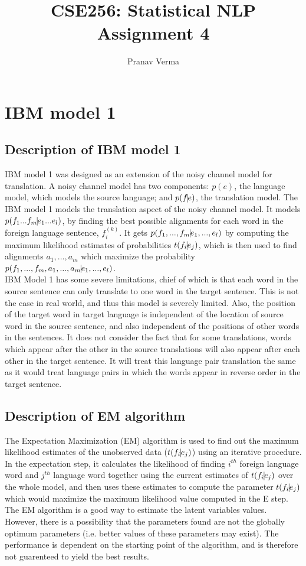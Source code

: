 \documentclass{article}
\title{CSE256: Statistical NLP Assignment 4}
\author{Pranav Verma}
\begin{document}
\maketitle
\section{IBM model 1}
	\subsection{Description of IBM model 1}
		IBM model 1 was designed as an extension of the noisy channel model for translation. A noisy channel model has two components: $p(e)$, the language model, which models the source language; and $p(f \vline e)$, the translation model. The IBM model 1 models the translation aspect of the noisy channel model. It models $p(f_{1}... f_{m} \vline e_{1}...e_{l})$, by finding the best possible alignments for each word in the foreign language sentence, $f_{i}^{(k)}$. It gets $p(f_{1},..., f_{m} \vline e_{1}, ..., e_{l})$ by computing the maximum likelihood estimates of probabilities $t(f_{i}\vline e_{j})$, which is then used to find alignments $a_{1},...,a_{m}$ which maximize the probability $p(f_{1},..., f_{m}, a_1,..., a_m \vline e_{1}, ..., e_{l})$.
		\\IBM Model 1 has some severe limitations, chief of which is that each word in the source sentence can only translate to one word in the target sentence. This is not the case in real world, and thus this model is severely limited. Also, the position of the target word in target language is independent of the location of source word in the source sentence, and also independent of the positions of other words in the sentences. It does not consider the fact that for some translations, words which appear after the other in the source translations will also appear after each other in the target sentence. It will treat this language pair translation the same as it would treat language pairs in which the words appear in reverse order in the target sentence.
	\subsection{Description of EM algorithm}
		The Expectation Maximization (EM) algorithm is used to find out the maximum likelihood estimates of the unobserved data ($t(f_{i}\vline e_{j})$) using an iterative procedure. In the expectation step, it calculates the likelihood of finding $i^{th}$ foreign language word and $j^{th}$ language word together using the current estimates of $t(f_{i}\vline e_{j})$ over the whole model, and then uses these estimates to compute the parameter $t(f_{i}\vline e_{j})$ which would maximize the maximum likelihood value computed in the E step.
		\\ The EM algorithm is a good way to estimate the latent variables values. However, there is a possibility that the parameters found are not the globally optimum parameters (i.e. better values of these parameters may exist). The performance is dependent on the starting point of the algorithm, and is therefore not guarenteed to yield the best results.
\end{document}
